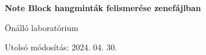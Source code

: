 
\begin{titlepage}
    \begin{center}
        \vspace*{1cm}
            
        \Huge
        \textbf{Note Block hangminták felismerése zenefájlban}
            
        \vspace{0.5cm}
        \LARGE
        Önálló laboratórium
            
        \vspace{2.5cm}
            
            
        \vfill
            
            
        \vspace{0.8cm}
            
            
        \Large
        Utolsó módosítás: 2024. 04. 30.
        \vspace*{1cm}
            
    \end{center}
\end{titlepage}
